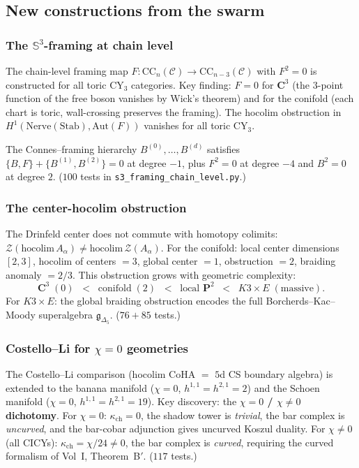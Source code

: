 \documentclass[11pt]{article}
\newcommand{\bS}{\mathbb{S}}
\begin{document}
\subsection{New constructions from the swarm}

\subsubsection{The $\bS^3$-framing at chain level}

The chain-level framing map $F \colon \mathrm{CC}_n(\mathcal{C}) \to \mathrm{CC}_{n-3}(\mathcal{C})$ with $F^2 = 0$ is constructed for all toric CY$_3$ categories. Key finding: $F = 0$ for $\mathbf{C}^3$ (the $3$-point function of the free boson vanishes by Wick's theorem) and for the conifold (each chart is toric, wall-crossing preserves the framing). The hocolim obstruction in $H^1(\mathrm{Nerve}(\mathrm{Stab}), \mathrm{Aut}(F))$ vanishes for all toric CY$_3$.

The Connes--framing hierarchy $B^{(0)}, \ldots, B^{(d)}$ satisfies $\{B, F\} + \{B^{(1)}, B^{(2)}\} = 0$ at degree $-1$, plus $F^2 = 0$ at degree $-4$ and $B^2 = 0$ at degree $2$. ($100$ tests in \texttt{s3\_framing\_chain\_level.py}.)

\subsubsection{The center-hocolim obstruction}

The Drinfeld center does not commute with homotopy colimits: $\mathcal{Z}(\mathrm{hocolim}\, A_\alpha) \neq \mathrm{hocolim}\, \mathcal{Z}(A_\alpha)$. For the conifold: local center dimensions $[2, 3]$, hocolim of centers $= 3$, global center $= 1$, obstruction $= 2$, braiding anomaly $= 2/3$. This obstruction grows with geometric complexity:
\[
 \mathbf{C}^3 \;(0) \;\;<\;\; \text{conifold} \;(2) \;\;<\;\; \text{local }\mathbf{P}^2 \;\;<\;\; K3 \times E \;(\text{massive}).
\]
For $K3 \times E$: the global braiding obstruction encodes the full Borcherds--Kac--Moody superalgebra $\mathfrak{g}_{\Delta_5}$. ($76 + 85$ tests.)

\subsubsection{Costello--Li for $\chi = 0$ geometries}

The Costello--Li comparison (hocolim CoHA $=$ $5$d CS boundary algebra) is extended to the banana manifold ($\chi = 0$, $h^{1,1} = h^{2,1} = 2$) and the Schoen manifold ($\chi = 0$, $h^{1,1} = h^{2,1} = 19$). Key discovery: the \textbf{$\chi = 0$ / $\chi \neq 0$ dichotomy}. For $\chi = 0$: $\kappa_{\mathrm{ch}} = 0$, the shadow tower is \emph{trivial}, the bar complex is \emph{uncurved}, and the bar-cobar adjunction gives uncurved Koszul duality. For $\chi \neq 0$ (all CICYs): $\kappa_{\mathrm{ch}} = \chi/24 \neq 0$, the bar complex is \emph{curved}, requiring the curved formalism of Vol~I, Theorem~B$'$. ($117$ tests.)
\end{document}
